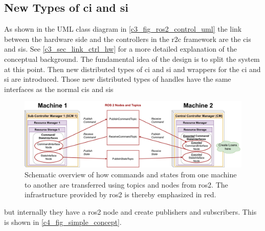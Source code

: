 \subsection{New Types of \gls{ci} and \gls{si}}\label{c4_sec_adaption_of_handles}
As shown in the UML class diagram in \autoref{c3_fig_ros2_control_uml} the link between the hardware side and the controllers in the \gls{r2c} framework are the \glspl{ci} and \glspl{si}. See \autoref{c3_sec_link_ctrl_hw} for a more detailed explanation of the conceptual background. \newline
The fundamental idea of the design is to split the system at this point. Then new distributed types of \gls{ci} and \gls{si} and wrappers for the \gls{ci} and \gls{si} are introduced. Those new distributed types of handles have the same interfaces as the normal \glspl{ci} and \glspl{si} 
\begin{figure}[htbp]
	\centering
    \includegraphics[width=1\textwidth]{Figures/C4/simple_concept.drawio.pdf}
	\caption{Schematic overview of how commands and states from one machine to another are transferred using topics and nodes from \gls{ros2}. The infrastructure provided by \gls{ros2} is thereby emphasized in red.}
	\label{c4_fig_simple_concept}
\end{figure}
but internally they have a \gls{ros2} node and create publishers and subscribers. This is shown in \autoref{c4_fig_simple_concept}. \newline

